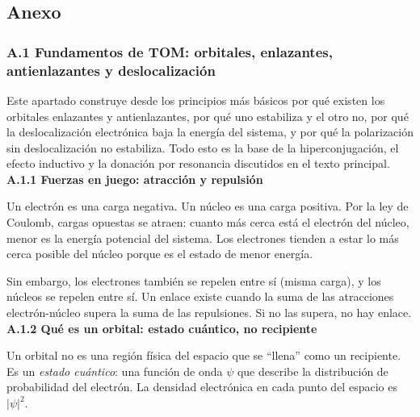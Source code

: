 
\label{sec:anexo}
\subsection*{\textcolor{blueunam}{Anexo}}

\label{sec:anexo:tom}
\subsubsection*{\textcolor{blueunam}{A.1 Fundamentos de TOM: orbitales, enlazantes,
antienlazantes y deslocalización}}

Este apartado construye desde los principios más básicos por qué existen los orbitales enlazantes y
antienlazantes, por qué uno estabiliza y el otro no, por qué la deslocalización electrónica baja
la energía del sistema, y por qué la polarización sin deslocalización no estabiliza. Todo esto es
la base de la hiperconjugación, el efecto inductivo y la donación por resonancia discutidos en el
texto principal. \\

\label{sec:anexo:tom:fuerzas}
\textbf{A.1.1 Fuerzas en juego: atracción y repulsión}

Un electrón es una carga negativa. Un núcleo es una carga positiva. Por la ley de Coulomb, cargas
opuestas se atraen: cuanto más cerca está el electrón del núcleo, menor es la energía potencial
del sistema. Los electrones tienden a estar lo más cerca posible del núcleo porque es el estado de
menor energía.

Sin embargo, los electrones también se repelen entre sí (misma carga), y los núcleos se repelen
entre sí. Un enlace existe cuando la suma de las atracciones electrón-núcleo supera la suma de las
repulsiones. Si no las supera, no hay enlace. \\

\label{sec:anexo:tom:orbital}
\textbf{A.1.2 Qué es un orbital: estado cuántico, no recipiente}

Un orbital no es una región física del espacio que se ``llena'' como un recipiente. Es un
\textit{estado cuántico}: una función de onda $\psi$ que describe la distribución de probabilidad
del electrón. La densidad electrónica en cada punto del espacio es $|\psi|^2$.

